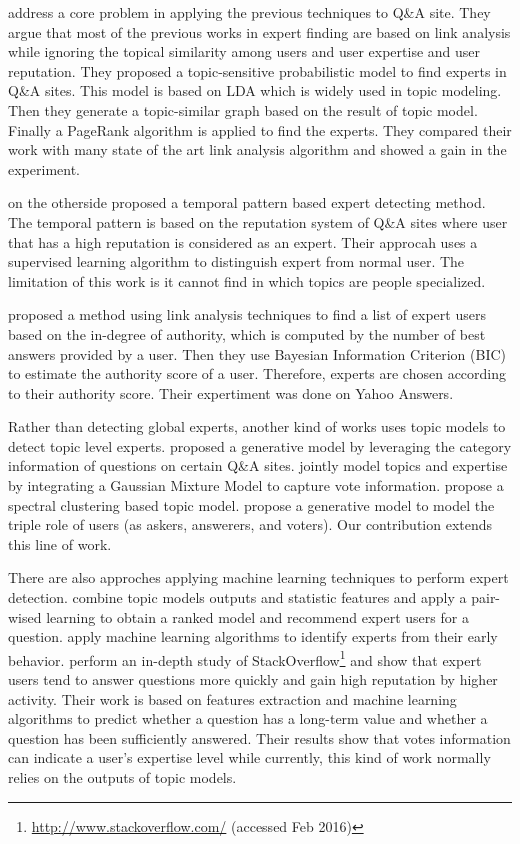 \cite{chp2Zhou:2012:TPM:2396761.2398493} address a core problem in applying the previous techniques to Q\&A site. They argue that most of the previous works in expert finding are based on link analysis while ignoring the topical similarity among users and user expertise and user reputation. They proposed a topic-sensitive probabilistic model to find experts in Q\&A sites. This model is based on LDA which is widely used in topic modeling. Then they generate a topic-similar graph based on the result of topic model. Finally a PageRank algorithm is applied to find the experts. They compared their work with many state of the art link analysis algorithm and showed a gain in the experiment.

\cite{chp2Pal:2010:Expert:evolution} on the otherside proposed a temporal pattern based expert detecting method. The temporal pattern is based on the reputation system of Q\&A sites where user that has a high reputation is considered as an expert. Their approcah uses a supervised learning algorithm to distinguish expert from normal user. The limitation of this work is it cannot find in which topics are people specialized.

\cite{chp2Bouguessa:2008:Identify:authority:indegree} proposed a method using link analysis techniques to find a list of expert users based on the in-degree of authority, which is computed by the number of best answers provided by a user. Then they use Bayesian Information Criterion (BIC) to estimate the authority score of a user. Therefore, experts are chosen according to their authority score. Their expertiment was done on Yahoo Answers.


Rather than detecting global experts, another kind of works uses topic models to detect topic level experts. \cite{guo2008tapping} proposed a generative model by leveraging the category information of questions on certain Q\&A sites. \cite{yang2013cqarank} jointly model topics and expertise by  integrating a Gaussian Mixture Model to capture vote information. \cite{Chang:2013} propose a spectral clustering based topic model. %
\cite{ma2015tri} propose a generative model to model the triple role of users (as askers, answerers, and voters). Our contribution extends this line of work. 

There are also approches applying machine learning techniques to perform expert detection. \cite{ji2013learning} combine topic models outputs and statistic features and apply a pair-wised learning to obtain a ranked model and recommend expert users for a question. \cite{pal2011early} apply machine learning algorithms to identify experts from their early behavior. \cite{anderson2012discovering} perform an in-depth study of StackOverflow\footnote{\url{http://www.stackoverflow.com/} (accessed Feb 2016)} and show that expert users tend to answer questions more quickly and gain high reputation by higher activity. Their work is based on features extraction and machine learning algorithms to predict whether a question has a long-term value and whether a question has been sufficiently answered. Their results show that votes information can indicate a user's expertise level while currently, this kind of work normally relies on the outputs of topic models.

